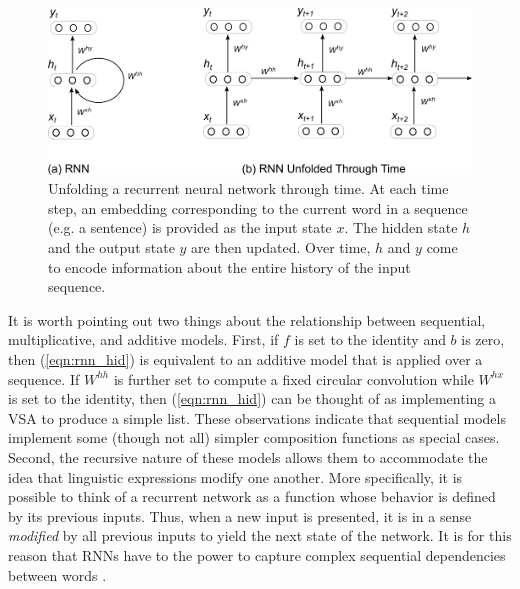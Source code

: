 \begin{figure}
\centering
	\includegraphics[width=5in]{figures/rnn.png}
	\caption{Unfolding a recurrent neural network through time. At each time step, an embedding corresponding to the current word in a sequence (e.g. a sentence) is provided as the input state $x$. The hidden state $h$ and the output state $y$ are then updated. Over time, $h$ and $y$ come to encode information about the entire history of the input sequence.}\label{fig:rnn}
\end{figure}

It is worth pointing out two things about the relationship between sequential, multiplicative, and additive models. First, if $f$ is set to the identity and $b$ is zero, then (\ref{eqn:rnn_hid}) is equivalent to an additive model that is applied over a sequence. If $W^{hh}$ is further set to compute a fixed circular convolution while $W^{hx}$ is set to the identity, then (\ref{eqn:rnn_hid}) can be thought of as implementing a VSA to produce a simple list. These observations indicate that sequential models implement some (though not all) simpler composition functions as special cases. Second, the recursive nature of these models allows them to accommodate the idea that linguistic expressions modify one another. More specifically, it is possible to think of a recurrent network as a function whose behavior is defined by its previous inputs. Thus, when a new input is presented, it is in a sense \textit{modified} by all previous inputs to yield the next state of the network. It is for this reason that RNNs have to the power to capture complex sequential dependencies between words \citep{Elman:1991,Sutskever:2014}.

